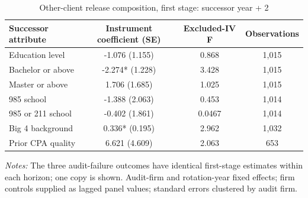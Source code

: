 \begin{table}[htbp]
\footnotesize
\centering
\caption{Other-client release composition, first stage: successor year + 2}
\begin{threeparttable}
\begin{tabular}{p{}ccc}
\toprule
Successor attribute & Instrument coefficient (SE) & Excluded-IV F & Observations \\
\midrule
Education level & -1.076 (1.155) & 0.868 & 1,015 \\
Bachelor or above & -2.274* (1.228) & 3.428 & 1,015 \\
Master or above & 1.706 (1.685) & 1.025 & 1,015 \\
985 school & -1.388 (2.063) & 0.453 & 1,014 \\
985 or 211 school & -0.402 (1.861) & 0.0467 & 1,014 \\
Big 4 background & 0.336* (0.195) & 2.962 & 1,032 \\
Prior CPA quality & 6.621 (4.609) & 2.063 & 653 \\
\bottomrule
\end{tabular}
\begin{tablenotes}\footnotesize
\item \raggedright \textit{Notes:} The three audit-failure outcomes have identical first-stage estimates within each horizon; one copy is shown. Audit-firm and rotation-year fixed effects; firm controls supplied as lagged panel values; standard errors clustered by audit firm.
\end{tablenotes}
\end{threeparttable}
\end{table}
